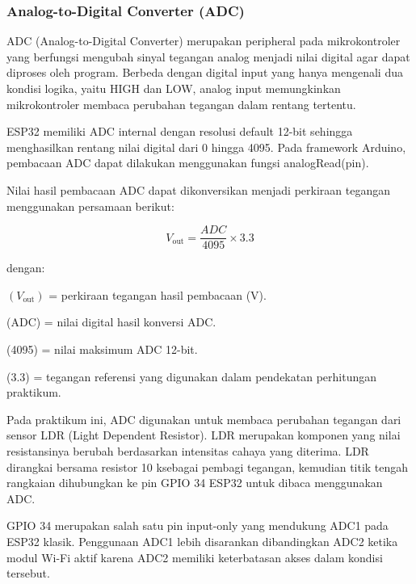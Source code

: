 \subsubsection{Analog-to-Digital Converter (ADC)}
ADC (Analog-to-Digital Converter) merupakan peripheral pada mikrokontroler yang berfungsi mengubah sinyal tegangan analog menjadi nilai digital agar dapat diproses oleh program. Berbeda dengan digital input yang hanya mengenali dua kondisi logika, yaitu HIGH dan LOW, analog input memungkinkan mikrokontroler membaca perubahan tegangan dalam rentang tertentu.

ESP32 memiliki ADC internal dengan resolusi default 12-bit sehingga menghasilkan rentang nilai digital dari 0 hingga 4095. Pada framework Arduino, pembacaan ADC dapat dilakukan menggunakan fungsi analogRead(pin).

Nilai hasil pembacaan ADC dapat dikonversikan menjadi perkiraan tegangan menggunakan persamaan berikut:

\[
V_{\text{out}} = \frac{ADC}{4095} \times 3.3
\]

dengan:

$(V_{\text{out}})$ = perkiraan tegangan hasil pembacaan (V).

(ADC) = nilai digital hasil konversi ADC.

(4095) = nilai maksimum ADC 12-bit.

(3.3) = tegangan referensi yang digunakan dalam pendekatan perhitungan praktikum.

Pada praktikum ini, ADC digunakan untuk membaca perubahan tegangan dari sensor LDR (Light Dependent Resistor). LDR merupakan komponen yang nilai resistansinya berubah berdasarkan intensitas cahaya yang diterima. LDR dirangkai bersama resistor 10 k\textohm  sebagai pembagi tegangan, kemudian titik tengah rangkaian dihubungkan ke pin GPIO 34 ESP32 untuk dibaca menggunakan ADC.

GPIO 34 merupakan salah satu pin input-only yang mendukung ADC1 pada ESP32 klasik. Penggunaan ADC1 lebih disarankan dibandingkan ADC2 ketika modul Wi-Fi aktif karena ADC2 memiliki keterbatasan akses dalam kondisi tersebut.


